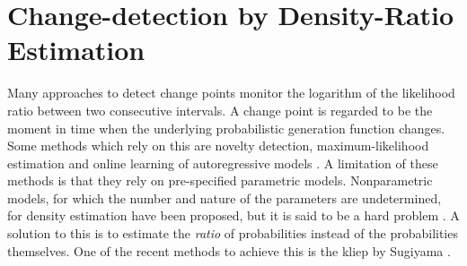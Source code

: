 \section{Change-detection by Density-Ratio Estimation}\label{sec:density-ratio}









Many approaches to detect change points monitor the logarithm of the likelihood ratio between two consecutive intervals.
A change point is regarded to be the moment in time when the underlying probabilistic generation function changes.
Some methods which rely on this are novelty detection, maximum-likelihood estimation and online learning of autoregressive models \cite{kawahara2009change}.
A limitation of these methods is that they rely on pre-specified parametric models.
Nonparametric models, for which the number and nature of the parameters are undetermined, for density estimation have been proposed, but it is said to be a hard problem \cite{hardle2004nonparametric, sugiyama2012density}.
A solution to this is to estimate the \emph{ratio} of probabilities instead of the probabilities themselves.
One of the recent methods to achieve this is the \gls{kliep} by Sugiyama \etal \cite{sugiyama2008direct}.

